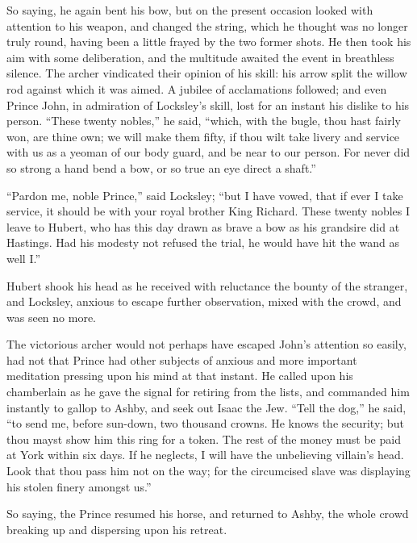 So saying, he again bent his bow, but on the present occasion looked
with attention to his weapon, and changed the string, which he thought
was no longer truly round, having been a little frayed by the two former
shots. He then took his aim with some deliberation, and the multitude
awaited the event in breathless silence. The archer vindicated their
opinion of his skill: his arrow split the willow rod against which it
was aimed. A jubilee of acclamations followed; and even Prince John, in
admiration of Locksley's skill, lost for an instant his dislike to his
person. ``These twenty nobles,'' he said, ``which, with the bugle, thou
hast fairly won, are thine own; we will make them fifty, if thou wilt
take livery and service with us as a yeoman of our body guard, and be
near to our person. For never did so strong a hand bend a bow, or so
true an eye direct a shaft.''

``Pardon me, noble Prince,'' said Locksley; ``but I have vowed, that if
ever I take service, it should be with your royal brother King Richard.
These twenty nobles I leave to Hubert, who has this day drawn as brave a
bow as his grandsire did at Hastings. Had his modesty not refused the
trial, he would have hit the wand as well I.''

Hubert shook his head as he received with reluctance the bounty of the
stranger, and Locksley, anxious to escape further observation, mixed
with the crowd, and was seen no more.

The victorious archer would not perhaps have escaped John's attention so
easily, had not that Prince had other subjects of anxious and more
important meditation pressing upon his mind at that instant. He called
upon his chamberlain as he gave the signal for retiring from the lists,
and commanded him instantly to gallop to Ashby, and seek out Isaac the
Jew. ``Tell the dog,'' he said, ``to send me, before sun-down, two
thousand crowns. He knows the security; but thou mayst show him this
ring for a token. The rest of the money must be paid at York within six
days. If he neglects, I will have the unbelieving villain's head. Look
that thou pass him not on the way; for the circumcised slave was
displaying his stolen finery amongst us.''

So saying, the Prince resumed his horse, and returned to Ashby, the
whole crowd breaking up and dispersing upon his retreat.
